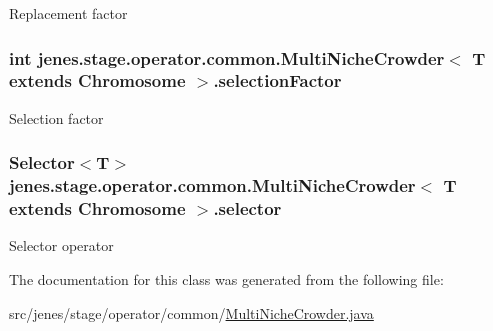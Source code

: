 Replacement factor \hypertarget{classjenes_1_1stage_1_1operator_1_1common_1_1_multi_niche_crowder_3_01_t_01extends_01_chromosome_01_4_ab561927a8af185e69bd5fcf85e904d7a}{
\subsubsection[{selection\-Factor}]{\setlength{\rightskip}{0pt plus 5cm}int jenes.\-stage.\-operator.\-common.\-Multi\-Niche\-Crowder$<$ T extends Chromosome $>$.selection\-Factor\hspace{0.3cm}{\ttfamily [protected]}}}\label{classjenes_1_1stage_1_1operator_1_1common_1_1_multi_niche_crowder_3_01_t_01extends_01_chromosome_01_4_ab561927a8af185e69bd5fcf85e904d7a}
Selection factor \hypertarget{classjenes_1_1stage_1_1operator_1_1common_1_1_multi_niche_crowder_3_01_t_01extends_01_chromosome_01_4_aec9f82fc79b7a63f5e664dfbcc7e9563}{
\subsubsection[{selector}]{\setlength{\rightskip}{0pt plus 5cm}Selector$<$T$>$ jenes.\-stage.\-operator.\-common.\-Multi\-Niche\-Crowder$<$ T extends Chromosome $>$.selector\hspace{0.3cm}{\ttfamily [protected]}}}\label{classjenes_1_1stage_1_1operator_1_1common_1_1_multi_niche_crowder_3_01_t_01extends_01_chromosome_01_4_aec9f82fc79b7a63f5e664dfbcc7e9563}
Selector operator 

The documentation for this class was generated from the following file\-:\begin{DoxyCompactItemize}
\item 
src/jenes/stage/operator/common/\hyperlink{_multi_niche_crowder_8java}{Multi\-Niche\-Crowder.\-java}\end{DoxyCompactItemize}
